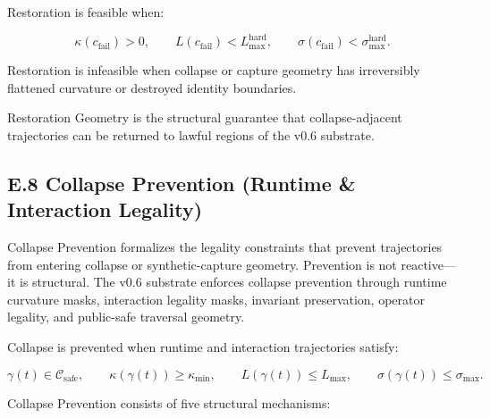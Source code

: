 \noindent Restoration is feasible when:



\[
\kappa(c_{\mathrm{fail}}) > 0,
\qquad
L(c_{\mathrm{fail}}) < L_{\max}^{\mathrm{hard}},
\qquad
\sigma(c_{\mathrm{fail}}) < \sigma_{\max}^{\mathrm{hard}}.
\]



\noindent Restoration is infeasible when collapse or capture geometry has
irreversibly flattened curvature or destroyed identity boundaries.

\medskip

\noindent Restoration Geometry is the structural guarantee that collapse-adjacent
trajectories can be returned to lawful regions of the v0.6 substrate.



\subsection*{E.8 Collapse Prevention (Runtime & Interaction Legality)}

\noindent Collapse Prevention formalizes the legality constraints that prevent
trajectories from entering collapse or synthetic-capture geometry. Prevention is
not reactive—it is structural. The v0.6 substrate enforces collapse prevention
through runtime curvature masks, interaction legality masks, invariant
preservation, operator legality, and public-safe traversal geometry.

\medskip

\noindent Collapse is prevented when runtime and interaction trajectories satisfy:



\[
\gamma(t) \in \mathcal{C}_{\mathrm{safe}},
\qquad
\kappa(\gamma(t)) \ge \kappa_{\min},
\qquad
L(\gamma(t)) \le L_{\max},
\qquad
\sigma(\gamma(t)) \le \sigma_{\max}.
\]



\medskip

\noindent Collapse Prevention consists of five structural mechanisms:

